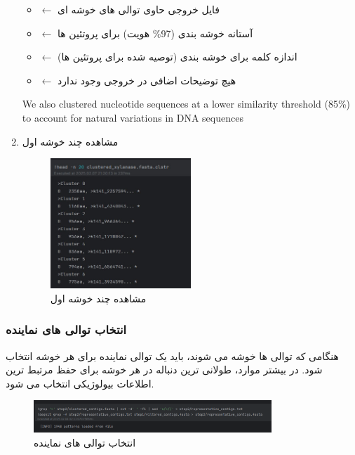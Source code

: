 \begin{enumerate}
\begin{itemize}
                    \item {} $\leftarrow$ فایل خروجی حاوی توالی های خوشه ای
                    \item {} $\leftarrow$ آستانه خوشه بندی (97\% هویت) برای پروتئین ها
                    \item {} $\leftarrow$ اندازه کلمه برای خوشه بندی (توصیه شده برای پروتئین ها)
                    \item {} $\leftarrow$ هیچ توضیحات اضافی در خروجی وجود ندارد
                \end{itemize}
                We also clustered nucleotide sequences at a lower similarity threshold (85\%) to account for natural variations in DNA sequences
            \item مشاهده چند خوشه اول
            \begin{figure}[H]
                \centering
                \includegraphics[width=0.5\textwidth]{images/print_top_clusters.jpg} %
                \caption{مشاهده چند خوشه اول}
                \label{fig:print_top_clusters}
            \end{figure}
        \end{enumerate}
    \subsubsection*{انتخاب توالی های نماینده}
    هنگامی که توالی ها خوشه می شوند، باید یک توالی نماینده برای هر خوشه انتخاب شود. در بیشتر موارد، طولانی ترین دنباله در هر خوشه برای حفظ مرتبط ترین اطلاعات بیولوژیکی انتخاب می شود.
    \begin{figure}[H]
        \centering
        \includegraphics[width=0.8\textwidth]{images/select_representives.png} %
        \caption{انتخاب توالی های نماینده}
        \label{fig:select_representives}
    \end{figure}

